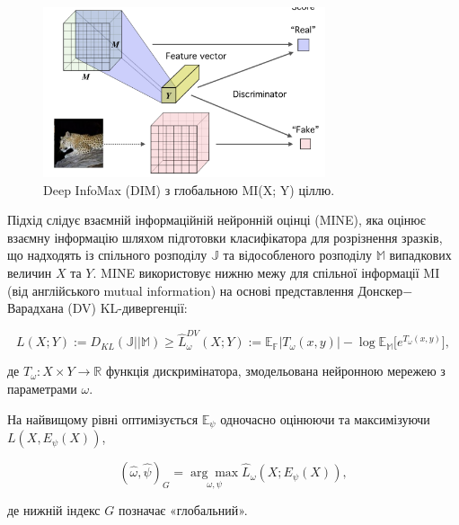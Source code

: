 \begin{figure}[h]
  \includegraphics[width=\textwidth, height=5cm, natwidth=266, natheight=160]{Mal/deepinfo2.jpg}
  \caption{Deep InfoMax (DIM) з глобальною MI(X; Y) ціллю.}
  \label{fig:deepinfo2}
\end{figure}

Підхід слідує взаємній інформаційній нейронній оцінці (MINE), яка оцінює взаємну інформацію шляхом підготовки класифікатора для розрізнення зразків, що надходять із спільного розподілу $\mathbb{J}$ та відособленого розподілу $\mathbb{M}$ випадкових величин $X$ та $Y$. MINE використовує нижню межу для спільної інформації MI (від англійського mutual information) на основі представлення Донскер$-$Варадхана (DV) KL-дивергенції:

\begin{equation}\label{eq:dv}
L(X; Y) := D_{KL}(\mathbb{J}||\mathbb{M}) \ge \hat{L}_{\omega}^{DV}(X;Y):=\mathbb{E}_{\mathbb{F}}|T_{\omega}(x,y)| - \log{\mathbb{E}_{\mathbb{M}}[e^{T_{\omega}(x,y)}}],
\end{equation}

\noindent де $T_{\omega}: X \times Y \rightarrow \mathbb{R}$ функція дискримінатора, змодельована нейронною\newline 
\hspace*{15pt}мережею з параметрами $\omega$.

\vspace{1.5em}

На найвищому рівні оптимізується $\mathbb{E_{\psi}}$ одночасно оцінюючи та максимізуючи $L(X, E_{\psi}(X))$,

\begin{equation}\label{eq:e_psi_opt}
(\hat{\omega}, \hat{\psi})_{G} = \underset{\omega,\psi}{\arg\max}\hat{L}_{\omega}(X;E_{\psi}(X)),
\end{equation}

\vspace{1.5em}

\noindent де нижній індекс $G$ позначає «глобальний». 


